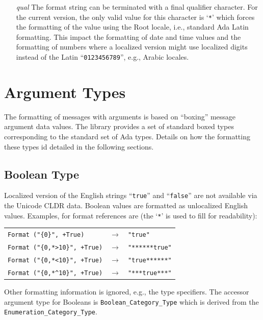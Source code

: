 \begin{itemize}
\item[\textit{qual}]
    The format string can be terminated with a final qualifier character.  For
    the current version, the only valid value for this character is `\texttt{*}'
    which forces the formatting of the value using the Root locale, i.e.,
    standard Ada Latin formatting.  This impact the formatting of date and time
    values and the formatting of numbers where a localized version might use
    localized digits instead of the Latin ``\texttt{0123456789}'', e.g.,
    Arabic locales.
\end{itemize}

\section{Argument Types}
\label{sec:argtypes}

The formatting of messages with arguments is based on ``boxing'' message
argument data values.  The library provides a set of standard boxed types
corresponding to the standard set of Ada types.  Details on how the formatting
these types id detailed in the following sections.

\subsection{Boolean Type}

Localized version of the English strings ``\texttt{true}'' and
``\texttt{false}'' are not available via the Unicode CLDR data.  Boolean
values are formatted as unlocalized English values.  Examples, for format
references are (the `\texttt{*}' is used to fill for readability):
\begin{center}
\begin{tabular}{lll}
\verb|Format ("{0}", +True)| & $\rightarrow$ & \verb|"true"|\\
\verb|Format ("{0,*>10}", +True)| & $\rightarrow$ & \verb|"******true"|\\
\verb|Format ("{0,*<10}", +True)| & $\rightarrow$ & \verb|"true******"|\\
\verb|Format ("{0,*^10}", +True)| & $\rightarrow$ & \verb|"***true***"|\\
\end{tabular}
\end{center}
Other formatting information is ignored, e.g., the type specifiers.  The
accessor argument type for Booleans is \texttt{Boolean\_Category\_Type}
which is derived from the \texttt{Enumeration\_Category\_Type}.

